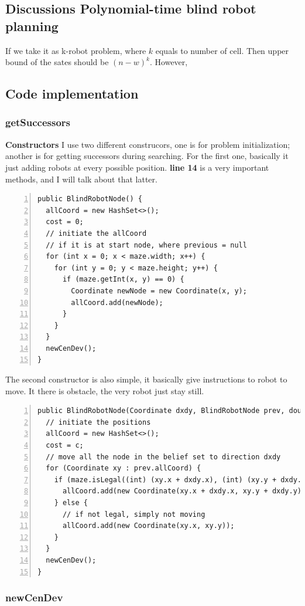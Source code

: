 \documentclass{article}
\begin{document}
\subsection{Discussions Polynomial-time blind robot planning}
If we take it as k-robot problem, where $k$ equals to number of cell. Then upper bound of the sates should be $(n-w)^k$. However, 

\subsection{Code implementation}

\subsubsection{getSuccessors}

\textbf{Constructors}
I use two different construcors, one is for problem initialization; another is for getting successors during searching. For the first one, basically it just adding robots at every possible position. \textbf{line 14} is a very important methods, and I will talk about that latter.
\begin{lstlisting}[numbers=left]
public BlindRobotNode() {
  allCoord = new HashSet<>();
  cost = 0;
  // initiate the allCoord
  // if it is at start node, where previous = null
  for (int x = 0; x < maze.width; x++) {
    for (int y = 0; y < maze.height; y++) {
      if (maze.getInt(x, y) == 0) {
        Coordinate newNode = new Coordinate(x, y);
        allCoord.add(newNode);
      }
    }
  }
  newCenDev();
}
\end{lstlisting}
The second constructor is also simple, it basically give instructions to robot to move. It there is obstacle, the very robot just stay still.
\begin{lstlisting}[numbers=left]
public BlindRobotNode(Coordinate dxdy, BlindRobotNode prev, double c) {
  // initiate the positions
  allCoord = new HashSet<>();
  cost = c;
  // move all the node in the belief set to direction dxdy
  for (Coordinate xy : prev.allCoord) {
    if (maze.isLegal((int) (xy.x + dxdy.x), (int) (xy.y + dxdy.y))) {
      allCoord.add(new Coordinate(xy.x + dxdy.x, xy.y + dxdy.y));
    } else {
      // if not legal, simply not moving
      allCoord.add(new Coordinate(xy.x, xy.y));
    }
  }
  newCenDev();
}
\end{lstlisting}

\subsubsection{newCenDev}
\end{document}
